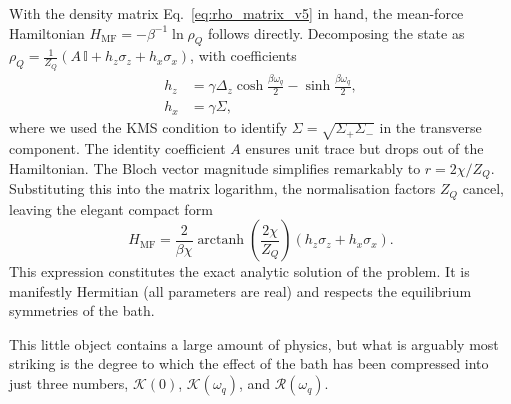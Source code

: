With the density matrix Eq.~\eqref{eq:rho_matrix_v5} in hand, the mean-force Hamiltonian $H_\mathrm{MF} = -\beta^{-1}\ln\rho_Q$ follows directly. Decomposing the state as $\rho_Q = \frac{1}{Z_Q}(A\,\mathbb{I} + h_z\sigma_z + h_x\sigma_x)$, with coefficients
\begin{align}
    h_z &= \gamma\Delta_z\cosh\frac{\beta\omega_q}{2} - \sinh\frac{\beta\omega_q}{2}, \\
    h_x &= \gamma\Sigma,
\end{align}
where we used the KMS condition to identify $\Sigma= \sqrt{\Sigma_+\Sigma_-}$ in the transverse component. The identity coefficient $A$ ensures unit trace but drops out of the Hamiltonian. 
The Bloch vector magnitude simplifies remarkably to $r = 2\chi/Z_Q$.  Substituting this into the matrix logarithm, the normalisation factors $Z_Q$ cancel, leaving the elegant compact form
\begin{equation}
    H_\mathrm{MF} = \frac{2}{\beta\chi}\operatorname{arctanh}\!\left(\frac{2\chi}{Z_Q}\right)
    \left( h_z\sigma_z + h_x\sigma_x \right).
    \label{eq:HMF_final_clean}
\end{equation}
This expression constitutes the exact analytic solution of the problem. It is manifestly Hermitian (all parameters are real) and respects the equilibrium symmetries of the bath.

This little object contains a large amount of physics, but what is arguably most striking is the degree to which the effect of the bath has been compressed into just three numbers, $\mathcal{K}(0)$, $\mathcal{K}(\omega_q)$, and $\mathcal{R}(\omega_q)$. 






